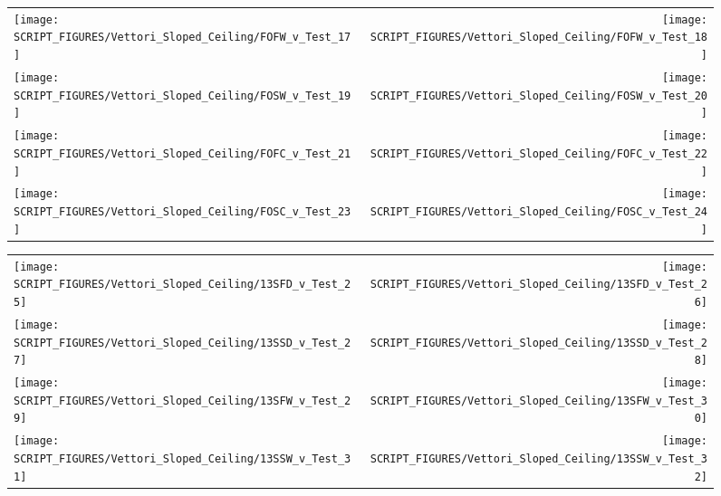 \begin{figure}[!ht]
\begin{tabular*}{\textwidth}{l@{\extracolsep{\fill}}r}
\texttt{[image: SCRIPT\_FIGURES/Vettori\_Sloped\_Ceiling/FOFW\_v\_Test\_17]} &
\texttt{[image: SCRIPT\_FIGURES/Vettori\_Sloped\_Ceiling/FOFW\_v\_Test\_18]} \\
\texttt{[image: SCRIPT\_FIGURES/Vettori\_Sloped\_Ceiling/FOSW\_v\_Test\_19]} &
\texttt{[image: SCRIPT\_FIGURES/Vettori\_Sloped\_Ceiling/FOSW\_v\_Test\_20]} \\
\texttt{[image: SCRIPT\_FIGURES/Vettori\_Sloped\_Ceiling/FOFC\_v\_Test\_21]} &
\texttt{[image: SCRIPT\_FIGURES/Vettori\_Sloped\_Ceiling/FOFC\_v\_Test\_22]} \\
\texttt{[image: SCRIPT\_FIGURES/Vettori\_Sloped\_Ceiling/FOSC\_v\_Test\_23]} &
\texttt{[image: SCRIPT\_FIGURES/Vettori\_Sloped\_Ceiling/FOSC\_v\_Test\_24]} \\
\end{tabular*}
\label{Vettori_Sloped_3}
\end{figure}

\begin{figure}[!ht]
\begin{tabular*}{\textwidth}{l@{\extracolsep{\fill}}r}
\texttt{[image: SCRIPT\_FIGURES/Vettori\_Sloped\_Ceiling/13SFD\_v\_Test\_25]} &
\texttt{[image: SCRIPT\_FIGURES/Vettori\_Sloped\_Ceiling/13SFD\_v\_Test\_26]} \\
\texttt{[image: SCRIPT\_FIGURES/Vettori\_Sloped\_Ceiling/13SSD\_v\_Test\_27]} &
\texttt{[image: SCRIPT\_FIGURES/Vettori\_Sloped\_Ceiling/13SSD\_v\_Test\_28]} \\
\texttt{[image: SCRIPT\_FIGURES/Vettori\_Sloped\_Ceiling/13SFW\_v\_Test\_29]} &
\texttt{[image: SCRIPT\_FIGURES/Vettori\_Sloped\_Ceiling/13SFW\_v\_Test\_30]} \\
\texttt{[image: SCRIPT\_FIGURES/Vettori\_Sloped\_Ceiling/13SSW\_v\_Test\_31]} &
\texttt{[image: SCRIPT\_FIGURES/Vettori\_Sloped\_Ceiling/13SSW\_v\_Test\_32]} \\
\end{tabular*}
\label{Vettori_Sloped_4}
\end{figure}

